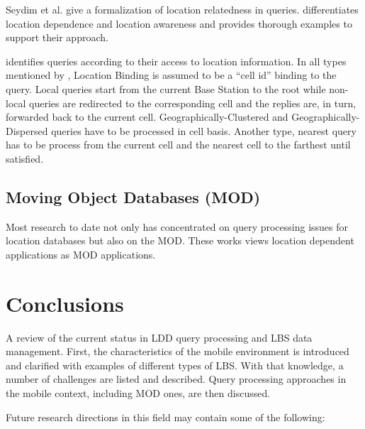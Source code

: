 \documentclass[12pt,a4paper,titlepage]{article}
\begin{document}
Seydim et al. give a formalization of location relatedness in queries. \cite{Seydim:2001wk} differentiates location dependence and location awareness and provides thorough examples to support their approach.

\cite{xu2000querying} identifies queries according to their access to location information. In all types mentioned by \cite{xu2000querying}, Location Binding is assumed to be a ``cell id'' binding to the query. Local queries start from the current Base Station to the root while non-local queries are redirected to the corresponding cell and the replies are, in turn, forwarded back to the current cell. Geographically-Clustered and Geographically-Dispersed queries have to be processed in cell basis. Another type, nearest query has to be process from the current cell and the nearest cell to the farthest until satisfied.

\subsection{Moving Object Databases (MOD)} %
\label{sub:moving_object_databases}
Most research to date not only has concentrated on query processing issues for location databases but also on the MOD. \cite{prasad1997modeling, wolfson1998moving} These works views location dependent applications as MOD applications.


\section{Conclusions} %
\label{sec:conclusions}
A review of the current status in LDD query processing and LBS data management. First, the characteristics of the mobile environment is introduced and clarified with examples of different types of LBS. With that knowledge, a number of challenges are listed and described. Query processing approaches in the mobile context, including MOD ones, are then discussed.

Future research directions in this field may contain some of the following:
\end{document}
